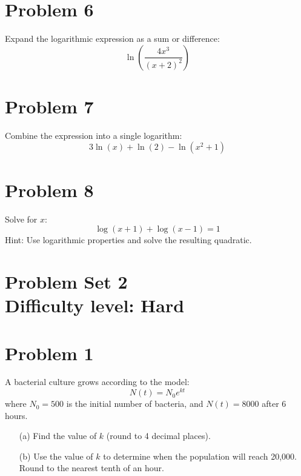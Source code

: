 \documentclass[12pt]{article}
\begin{document}
\section*{Problem 6}
Expand the logarithmic expression as a sum or difference:
\[
\ln\left(\frac{4x^3}{(x + 2)^2} \right)
\]

\section*{Problem 7}
Combine the expression into a single logarithm:
\[
3 \ln(x) + \ln(2) - \ln(x^2 + 1)
\]

\section*{Problem 8}
Solve for \( x \):
\[
\log(x + 1) + \log(x - 1) = 1
\]
Hint: Use logarithmic properties and solve the resulting quadratic.


\section*{Problem Set 2\\Difficulty level: Hard}
\section*{Problem 1}
A bacterial culture grows according to the model:
\[
N(t) = N_0 e^{kt}
\]
where \( N_0 = 500 \) is the initial number of bacteria, and \( N(t) = 8000 \) after 6 hours.

\begin{itemize}
    \item[(a)] Find the value of \( k \) (round to 4 decimal places).
    \item[(b)] Use the value of \( k \) to determine when the population will reach 20,000. Round to the nearest tenth of an hour.
\end{itemize}
\end{document}
